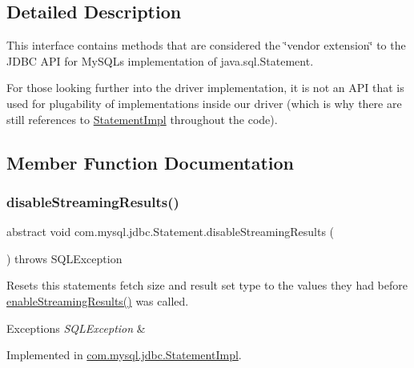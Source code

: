 \subsection{Detailed Description}
This interface contains methods that are considered the \char`\"{}vendor extension\char`\"{} to the J\+D\+BC A\+PI for My\+S\+QL\textquotesingle{}s implementation of java.\+sql.\+Statement.

For those looking further into the driver implementation, it is not an A\+PI that is used for plugability of implementations inside our driver (which is why there are still references to \mbox{\hyperlink{classcom_1_1mysql_1_1jdbc_1_1_statement_impl}{Statement\+Impl}} throughout the code). 

\subsection{Member Function Documentation}
\mbox{\label{interfacecom_1_1mysql_1_1jdbc_1_1_statement_a68a7ee39de3b6cc9743674b40c5d9f73}} 
\subsubsection{\texorpdfstring{disable\+Streaming\+Results()}{disableStreamingResults()}}
{\footnotesize\ttfamily abstract void com.\+mysql.\+jdbc.\+Statement.\+disable\+Streaming\+Results (\begin{DoxyParamCaption}{ }\end{DoxyParamCaption}) throws S\+Q\+L\+Exception\hspace{0.3cm}{\ttfamily [abstract]}}

Resets this statements fetch size and result set type to the values they had before \mbox{\hyperlink{interfacecom_1_1mysql_1_1jdbc_1_1_statement_aa90a0a4175d666982052d7bccacc272e}{enable\+Streaming\+Results()}} was called.


\begin{DoxyExceptions}{Exceptions}
{\em S\+Q\+L\+Exception} & \\
\hline
\end{DoxyExceptions}


Implemented in \mbox{\hyperlink{classcom_1_1mysql_1_1jdbc_1_1_statement_impl_a1189cc8b7b69c3abdcee0cedb03298f5}{com.\+mysql.\+jdbc.\+Statement\+Impl}}.

